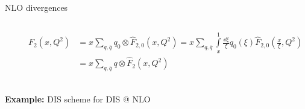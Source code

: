 \documentclass[8pt]{beamer}
\begin{document}
\begin{frame}{NLO divergences}
\begin{columns}
\begin{column}{0.4\textwidth}
        \end{column}

        \begin{column}{0.55\textwidth}
            \begin{align*}
                F_2(x,Q^2) &= x\sum_{q,\bar{q}} q_0 \otimes \hat{F}_{2,0} (x, Q^2) =
                x \sum_{q,\bar{q}} \int\limits_x^1 \frac{\dd\xi}{\xi} q_0(\xi)
                \hat{F}_{2,0}\left(\frac{x}{\xi},Q^2\right)\\
                &= x \sum_{q,\bar{q}} q \otimes \hat{F}_2 (x, Q^2)\\
            \end{align*}
        \end{column}
    \end{columns}

    \textbf{Example:} DIS scheme for DIS @ NLO
\end{frame}
\end{document}
